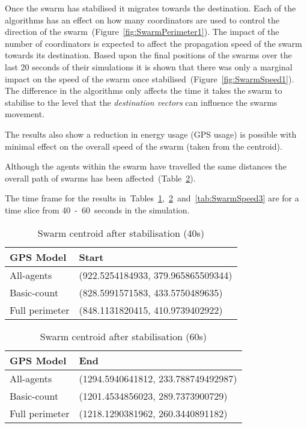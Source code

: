 \documentclass{ieeeaccess}
\begin{document}
Once the swarm has stabilised it migrates towards the destination. Each of the algorithms has an effect on how many coordinators are used to control the direction of the swarm~(Figure~\ref{fig:SwarmPerimeter1}). The impact of the number of coordinators is expected to affect the propagation speed of the swarm towards its destination. Based upon the final positions of the swarms over the last 20 seconds of their simulations it is shown that there was only a marginal impact on the speed of the swarm once stabilised~(Figure~\ref{fig:SwarmSpeed1}). The difference in the algorithms only affects the time it takes the swarm to stabilise to the level that the \textit{destination vectors} can influence the swarms movement.

The results also show a reduction in energy usage (GPS usage) is possible with minimal effect on the overall speed of the swarm (taken from the centroid). 

Although the agents within the swarm have travelled the same distances the overall path of swarms has been affected~(Table~\ref{tab:SwarmSpeed2}).

The time frame for the results in~Tables~\ref{tab:SwarmSpeed1},~\ref{tab:SwarmSpeed2}~and~\ref{tab:SwarmSpeed3} are for a time slice from 40~-~60~seconds in the simulation.

\begin{table}
\begin{center}
\begin{tabular}{| l | l |}
\hline
GPS Model & Start \\ \hline
All-agents & (922.5254184933, 379.965865509344) \\ \hline
Basic-count & (828.5991571583, 433.5750489635) \\ \hline
Full perimeter & (848.1131820415, 410.9739402922) \\ \hline
\end{tabular}\caption{Swarm centroid after stabilisation (40s)} \label{tab:SwarmSpeed1}
\end{center}
\end{table}

\begin{table}
\begin{center}
\begin{tabular}{| l | l |}
\hline
GPS Model & End  \\ \hline
All-agents & (1294.5940641812, 233.788749492987) \\ \hline
Basic-count & (1201.4534856023, 289.7373900729) \\ \hline
Full perimeter & (1218.1290381962, 260.3440891182)\\ \hline
\end{tabular}\caption{Swarm centroid after stabilisation (60s)} \label{tab:SwarmSpeed2}
\end{center}
\end{table}
\end{document}
